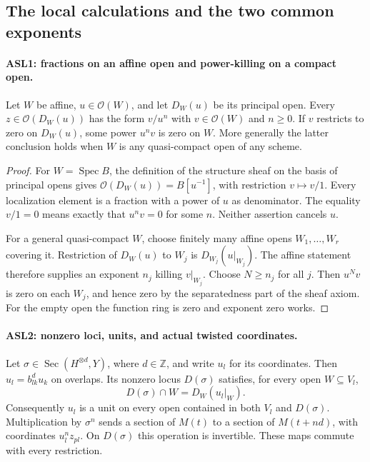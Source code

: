 \subsection{The local calculations and the two common exponents}

\paragraph{ASL1: fractions on an affine open and power-killing on a compact open.}
\label{claim:ASL1}
Let $W$ be affine, $u\in\mathcal O(W)$, and let $D_W(u)$ be its
principal open.  Every $z\in\mathcal O(D_W(u))$ has the form
$v/u^n$ with $v\in\mathcal O(W)$ and $n\ge0$.  If $v$ restricts
to zero on $D_W(u)$, some power $u^nv$ is zero on $W$.
More generally the latter conclusion holds when $W$ is any
quasi-compact open of any scheme.

\begin{proof}
For $W=\operatorname{Spec}B$, the definition of the structure sheaf
on the basis of principal opens gives
$\mathcal O(D_W(u))=B[u^{-1}]$, with restriction $v\mapsto v/1$.
Every localization element is a fraction with a power of $u$ as
denominator.  The equality $v/1=0$ means exactly that
$u^nv=0$ for some $n$.  Neither assertion cancels $u$.

For a general quasi-compact $W$, choose finitely many affine opens
$W_1,\ldots,W_r$ covering it.  Restriction of $D_W(u)$ to $W_j$
is $D_{W_j}(u|_{W_j})$.  The affine statement therefore supplies
an exponent $n_j$ killing $v|_{W_j}$.  Choose $N\ge n_j$ for all
$j$.  Then $u^Nv$ is zero on each $W_j$, and hence zero by the
separatedness part of the sheaf axiom.  For the empty open the
function ring is zero and exponent zero works.
\end{proof}

\paragraph{ASL2: nonzero loci, units, and actual twisted coordinates.}
\label{claim:ASL2}
Let $\sigma\in\operatorname{Sec}(H^{\otimes d},Y)$, where
$d\in\mathbb Z$, and write $u_l$ for its coordinates.  Then
$u_l=b_{lk}^{d}u_k$ on overlaps.  Its nonzero locus $D(\sigma)$
satisfies, for every open $W\subseteq V_l$,
\[
 D(\sigma)\cap W=D_W(u_l|_W).                       \tag{ASL.3}
\]
Consequently $u_l$ is a unit on every open contained in both
$V_l$ and $D(\sigma)$.  Multiplication by $\sigma^n$ sends a
section of $M(t)$ to a section of $M(t+nd)$, with coordinates
$u_l^nz_{pl}$.  On $D(\sigma)$ this operation is invertible.
These maps commute with every restriction.

